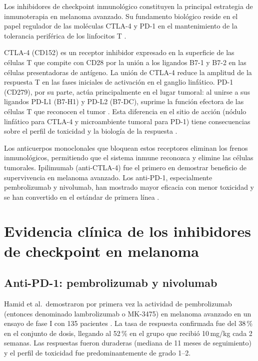 Los inhibidores de checkpoint inmunológico constituyen la principal estrategia de inmunoterapia en melanoma avanzado. Su fundamento biológico reside en el papel regulador de las moléculas CTLA-4 y PD-1 en el mantenimiento de la tolerancia periférica de los linfocitos T \cite{FifeBluestone2008}.

CTLA-4 (CD152) es un receptor inhibidor expresado en la superficie de las células T que compite con CD28 por la unión a los ligandos B7-1 y B7-2 en las células presentadoras de antígeno. La unión de CTLA-4 reduce la amplitud de la respuesta T en las fases iniciales de activación en el ganglio linfático. PD-1 (CD279), por su parte, actúa principalmente en el lugar tumoral: al unirse a sus ligandos PD-L1 (B7-H1) y PD-L2 (B7-DC), suprime la función efectora de las células T que reconocen el tumor \cite{FifeBluestone2008}. Esta diferencia en el sitio de acción (nódulo linfático para CTLA-4 y microambiente tumoral para PD-1) tiene consecuencias sobre el perfil de toxicidad y la biología de la respuesta \cite{Dempke2017}.

Los anticuerpos monoclonales que bloquean estos receptores eliminan los frenos inmunológicos, permitiendo que el sistema inmune reconozca y elimine las células tumorales. Ipilimumab (anti-CTLA-4) fue el primero en demostrar beneficio de supervivencia en melanoma avanzado. Los anti-PD-1, especialmente pembrolizumab y nivolumab, han mostrado mayor eficacia con menor toxicidad y se han convertido en el estándar de primera línea \cite{Switzer2022}.

\section{Evidencia clínica de los inhibidores de checkpoint en melanoma}

\subsection{Anti-PD-1: pembrolizumab y nivolumab}

Hamid et al.\ demostraron por primera vez la actividad de pembrolizumab (entonces denominado lambrolizumab o MK-3475) en melanoma avanzado en un ensayo de fase I con 135 pacientes \cite{Hamid2013}. La tasa de respuesta confirmada fue del 38\,\% en el conjunto de dosis, llegando al 52\,\% en el grupo que recibió 10\,mg/kg cada 2 semanas. Las respuestas fueron duraderas (mediana de 11 meses de seguimiento) y el perfil de toxicidad fue predominantemente de grado 1--2.

